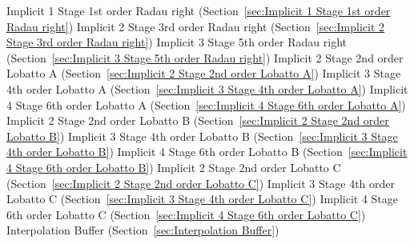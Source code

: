 \begin{list}{}
      \newline 
    Implicit 1 Stage 1st order Radau right (Section~\ref{sec:Implicit 1 Stage 1st order Radau right})
      \newline 
    Implicit 2 Stage 3rd order Radau right (Section~\ref{sec:Implicit 2 Stage 3rd order Radau right})
      \newline 
    Implicit 3 Stage 5th order Radau right (Section~\ref{sec:Implicit 3 Stage 5th order Radau right})
      \newline 
    Implicit 2 Stage 2nd order Lobatto A (Section~\ref{sec:Implicit 2 Stage 2nd order Lobatto A})
      \newline 
    Implicit 3 Stage 4th order Lobatto A (Section~\ref{sec:Implicit 3 Stage 4th order Lobatto A})
      \newline 
    Implicit 4 Stage 6th order Lobatto A (Section~\ref{sec:Implicit 4 Stage 6th order Lobatto A})
      \newline 
    Implicit 2 Stage 2nd order Lobatto B (Section~\ref{sec:Implicit 2 Stage 2nd order Lobatto B})
      \newline 
    Implicit 3 Stage 4th order Lobatto B (Section~\ref{sec:Implicit 3 Stage 4th order Lobatto B})
      \newline 
    Implicit 4 Stage 6th order Lobatto B (Section~\ref{sec:Implicit 4 Stage 6th order Lobatto B})
      \newline 
    Implicit 2 Stage 2nd order Lobatto C (Section~\ref{sec:Implicit 2 Stage 2nd order Lobatto C})
      \newline 
    Implicit 3 Stage 4th order Lobatto C (Section~\ref{sec:Implicit 3 Stage 4th order Lobatto C})
      \newline 
    Implicit 4 Stage 6th order Lobatto C (Section~\ref{sec:Implicit 4 Stage 6th order Lobatto C})
      \newline 
    Interpolation Buffer (Section~\ref{sec:Interpolation Buffer})

\end{list}
